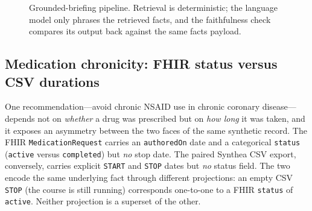 \begin{figure}[htbp]
\centering
{}
\caption{Grounded-briefing pipeline. Retrieval is deterministic; the language model only
phrases the retrieved facts, and the faithfulness check compares its output back against
the same facts payload.}
\label{fig:briefing-pipeline}
\end{figure}

\subsection{Medication chronicity: FHIR status versus CSV durations}
\label{sec:chronicity}
One recommendation---avoid chronic NSAID use in chronic coronary disease---depends not on
\emph{whether} a drug was prescribed but on \emph{how long} it was taken, and it exposes an
asymmetry between the two faces of the same synthetic record. The FHIR \texttt{MedicationRequest} carries an \texttt{authoredOn} date and a categorical
\texttt{status} (\texttt{active} versus \texttt{completed}) but \emph{no} stop date. The
paired Synthea CSV export, conversely, carries explicit \texttt{START} and \texttt{STOP}
dates but \emph{no} status field. The two encode the same underlying fact through different
projections: an empty CSV \texttt{STOP} (the course is still running) corresponds one-to-one
to a FHIR \texttt{status} of \texttt{active}. Neither projection is a superset of the other.

